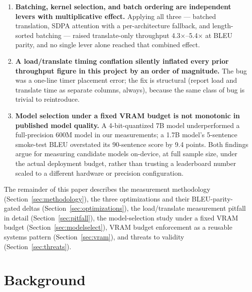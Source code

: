 \documentclass[conference]{IEEEtran}
\newcommand{\NLLBSPEEDUP}{5.4$\times$}
\newcommand{\SEAMLESSSPEEDUP}{4.3$\times$}
\begin{document}
\begin{enumerate}
  \item \textbf{Batching, kernel selection, and batch ordering are
        independent levers with multiplicative effect.} Applying all three
        --- batched translation, SDPA attention with a per-architecture
        fallback, and length-sorted batching --- raised translate-only
        throughput \SEAMLESSSPEEDUP--\NLLBSPEEDUP{} at BLEU parity, and no
        single lever alone reached that combined effect.

  \item \textbf{A load/translate timing conflation silently inflated every
        prior throughput figure in this project by an order of magnitude.}
        The bug was a one-line timer placement error; the fix is
        structural (report load and translate time as separate columns,
        always), because the same class of bug is trivial to reintroduce.

  \item \textbf{Model selection under a fixed VRAM budget is not monotonic
        in published model quality.} A 4-bit-quantized 7B model
        underperformed a full-precision 600M model in our measurements;
        a 1.7B model's 5-sentence smoke-test BLEU overstated its
        90-sentence score by 9.4 points. Both findings argue for measuring
        candidate models on-device, at full sample size, under the actual
        deployment budget, rather than trusting a leaderboard number scaled
        to a different hardware or precision configuration.
\end{enumerate}

The remainder of this paper describes the measurement methodology
(Section~\ref{sec:methodology}), the three optimizations and their
BLEU-parity-gated deltas (Section~\ref{sec:optimizations}), the load/translate
measurement pitfall in detail (Section~\ref{sec:pitfall}), the model-selection
study under a fixed VRAM budget (Section~\ref{sec:modelselect}), VRAM budget
enforcement as a reusable systems pattern (Section~\ref{sec:vram}), and
threats to validity (Section~\ref{sec:threats}).

\section{Background}
\end{document}
